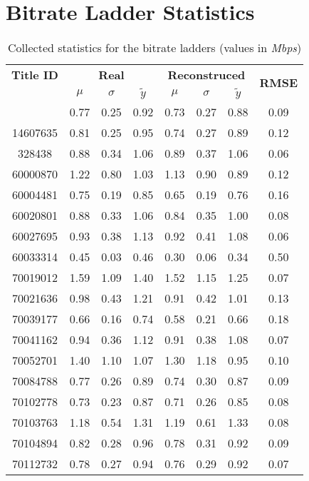 \chapter{Bitrate Ladder Statistics}\label{app_ladder}

\begin{longtable}{|c|c c c|c c c|c|}
    \caption{Collected statistics for the bitrate ladders (values in
    \emph{Mbps})}\label{tab:bitrate_ladders_stats}\\
\hline
\textbf{Title ID} &
\multicolumn{3}{c|}{\textbf{Real}} &
\multicolumn{3}{c|}{\textbf{Reconstruced}} &
\multirow{2}{*}{\textbf{RMSE}} \\
& $\mu$ & $\sigma$ & $\tilde{y}$ & $\mu$ & $\sigma$ & $\tilde{y}$ & \\
\hline
\endhead
\hline
\endfoot
1151721 & 0.77 & 0.25 & 0.92 & 0.73 & 0.27 & 0.88 & 0.09 \\
14607635 & 0.81 & 0.25 & 0.95 & 0.74 & 0.27 & 0.89 & 0.12 \\
328438 & 0.88 & 0.34 & 1.06 & 0.89 & 0.37 & 1.06 & 0.06 \\
60000870 & 1.22 & 0.80 & 1.03 & 1.13 & 0.90 & 0.89 & 0.12 \\
60004481 & 0.75 & 0.19 & 0.85 & 0.65 & 0.19 & 0.76 & 0.16 \\
60020801 & 0.88 & 0.33 & 1.06 & 0.84 & 0.35 & 1.00 & 0.08 \\
60027695 & 0.93 & 0.38 & 1.13 & 0.92 & 0.41 & 1.08 & 0.06 \\
\rowcolor{lightgray}60033314 & 0.45 & 0.03 & 0.46 & 0.30 & 0.06 & 0.34 & 0.50 \\
70019012 & 1.59 & 1.09 & 1.40 & 1.52 & 1.15 & 1.25 & 0.07 \\
70021636 & 0.98 & 0.43 & 1.21 & 0.91 & 0.42 & 1.01 & 0.13 \\
70039177 & 0.66 & 0.16 & 0.74 & 0.58 & 0.21 & 0.66 & 0.18 \\
70041162 & 0.94 & 0.36 & 1.12 & 0.91 & 0.38 & 1.08 & 0.07 \\
70052701 & 1.40 & 1.10 & 1.07 & 1.30 & 1.18 & 0.95 & 0.10 \\
70084788 & 0.77 & 0.26 & 0.89 & 0.74 & 0.30 & 0.87 & 0.09 \\
70102778 & 0.73 & 0.23 & 0.87 & 0.71 & 0.26 & 0.85 & 0.08 \\
70103763 & 1.18 & 0.54 & 1.31 & 1.19 & 0.61 & 1.33 & 0.08 \\
70104894 & 0.82 & 0.28 & 0.96 & 0.78 & 0.31 & 0.92 & 0.09 \\
70112732 & 0.78 & 0.27 & 0.94 & 0.76 & 0.29 & 0.92 & 0.07 \\

\end{longtable}
